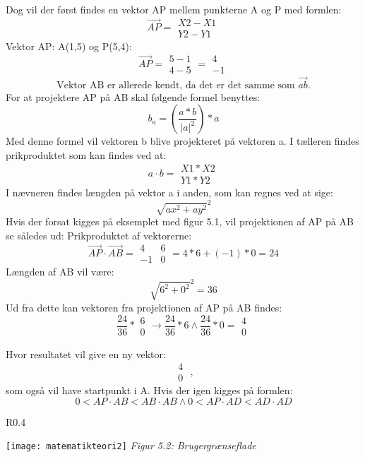 Dog vil der først findes en vektor AP mellem punkterne A og P med formlen: \[ \overrightarrow{AP} = \begin{matrix}X2-X1 \\ Y2-Y1\end{matrix} \]
Vektor AP: A(1,5) og P(5,4): \[ \overrightarrow{AP} = \begin{matrix}5-1 \\ 4-5\end{matrix} = \begin{matrix} 4 \\ -1 \end{matrix} \]
\[ \text{Vektor AB er allerede kendt, da det er det samme som } \overrightarrow{ab} \text{.} \]
For at projektere AP på AB skal følgende formel benyttes: \[ b_{a} = (\frac{a*b}{|a|^2}) * a \]
Med denne formel vil vektoren b blive projekteret på vektoren a. I tælleren findes prikproduktet som kan findes ved at: \[ a \cdot b = \begin{matrix}X1 * X2 \\ Y1 * Y2\end{matrix}  \]
I nævneren findes længden på vektor a i anden, som kan regnes ved at sige: \[ \sqrt{ax^2+ay^2}^2 \]
Hvis der forsat kigges på eksemplet med figur 5.1, vil projektionen af AP på AB se således ud:
Prikproduktet af vektorerne: \[ \overrightarrow{AP} \cdot \overrightarrow{AB} = \begin{matrix} 4 & 6 \\ -1 & 0 \end{matrix} = 4*6+(-1)*0 = 24 \]
Længden af AB vil være: \[ \sqrt{6^2+0^2}^2 = 36 \]
Ud fra dette kan vektoren fra projektionen af AP på AB findes: 
\[ \frac{24}{36} * \begin{matrix} 6 \\ 0 \end{matrix} \rightarrow \frac{24}{36} * 6 \wedge \frac{24}{36} * 0 = \begin{matrix} 4 \\ 0 \end{matrix} \]

Hvor resultatet vil give en ny vektor: \[ \begin{matrix} 4 \\ 0 \end{matrix} \text{ ,} \]  som også vil have startpunkt i A. Hvis der igen kigges på formlen:
\[0 < AP \cdot AB < AB \cdot AB \wedge 0 < AP \cdot AD < AD \cdot AD \]
\begin{wrapfigure}{R}{0.4\textwidth}
  \vspace{-20pt}
  \begin{center}
    \texttt{[image: matematikteori2]} \newline
    \textit{Figur 5.2: Brugergrænseflade}\newline
  \end{center}
  \vspace{-20pt}
\end{wrapfigure}

